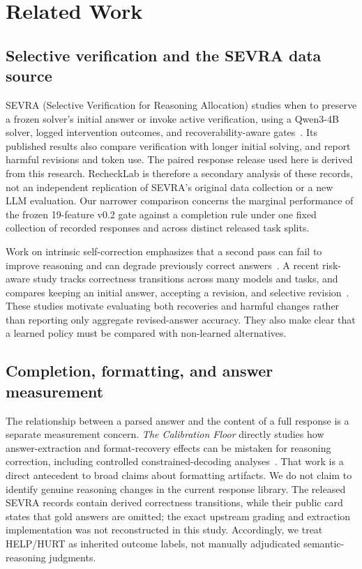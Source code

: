 \documentclass[conference]{IEEEtran}
\begin{document}
\section{Related Work}
\subsection{Selective verification and the SEVRA data source}
SEVRA (Selective Verification for Reasoning Allocation) studies when to preserve a frozen solver's initial answer or invoke active verification, using a Qwen3-4B solver, logged intervention outcomes, and recoverability-aware gates~\cite{dip2026sevra}. Its published results also compare verification with longer initial solving, and report harmful revisions and token use. The paired response release used here is derived from this research. RecheckLab is therefore a secondary analysis of these records, not an independent replication of SEVRA's original data collection or a new LLM evaluation. Our narrower comparison concerns the marginal performance of the frozen 19-feature v0.2 gate against a completion rule under one fixed collection of recorded responses and across distinct released task splits.

Work on intrinsic self-correction emphasizes that a second pass can fail to improve reasoning and can degrade previously correct answers~\cite{huang2024selfcorrect}. A recent risk-aware study tracks correctness transitions across many models and tasks, and compares keeping an initial answer, accepting a revision, and selective revision~\cite{zhang2026riskaware}. These studies motivate evaluating both recoveries and harmful changes rather than reporting only aggregate revised-answer accuracy. They also make clear that a learned policy must be compared with non-learned alternatives.

\subsection{Completion, formatting, and answer measurement}
The relationship between a parsed answer and the content of a full response is a separate measurement concern. \emph{The Calibration Floor} directly studies how answer-extraction and format-recovery effects can be mistaken for reasoning correction, including controlled constrained-decoding analyses~\cite{chen2026calibration}. That work is a direct antecedent to broad claims about formatting artifacts. We do not claim to identify genuine reasoning changes in the current response library. The released SEVRA records contain derived correctness transitions, while their public card states that gold answers are omitted; the exact upstream grading and extraction implementation was not reconstructed in this study. Accordingly, we treat HELP/HURT as inherited outcome labels, not manually adjudicated semantic-reasoning judgments.
\end{document}
